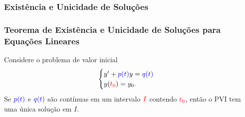 \begin{frame}
\frametitle{Existência e Unicidade de Soluções  }



\end{frame}


\begin{frame}
\frametitle{Teorema de Existência e Unicidade de Soluções para Equações Lineares }
\begin{teo} Considere o problema de valor inicial
\[\begin{cases}
y'+{\color{blue}p(t)}y={\color{blue}q(t)}\\
y({\color{red}t_0})=y_0.
\end{cases} \]
Se ${\color{blue}p(t)}$ e ${\color{blue}q(t)}$ são {\color{blue}contínuas} em um intervalo ${\color{red}I}$ contendo ${\color{red}t_0}$, então o PVI {\color{red}tem uma única solução} em $I$.
\end{teo}



\end{frame}


